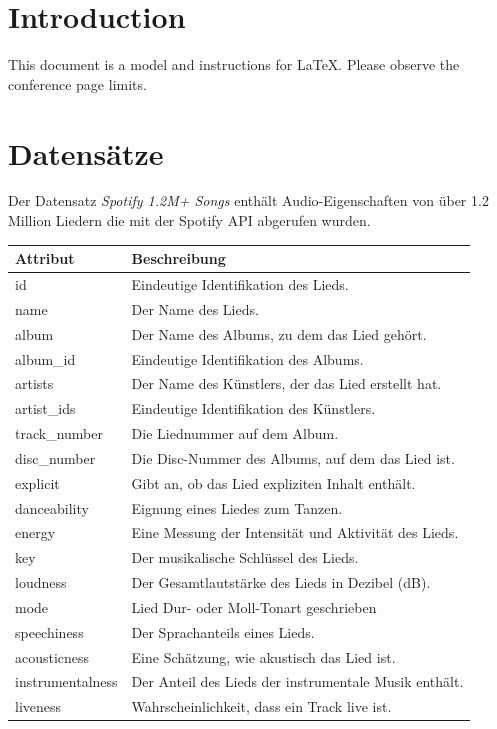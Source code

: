 \documentclass[conference]{IEEEtran}
\begin{document}
\section{Introduction}
This document is a model and instructions for \LaTeX.
Please observe the conference page limits. 
\section{Datensätze}
Der Datensatz \textit{Spotify 1.2M+ Songs} \cite{d2} enthält Audio-Eigenschaften von über 1.2 Million Liedern die mit der Spotify API abgerufen wurden.
\begin{table}[h]
\centering
\begin{tabular}{|l|l|}
\hline
Attribut & Beschreibung \\ \hline
id & Eindeutige Identifikation des Lieds. \\ \hline
name & Der Name des Lieds. \\ \hline
album & Der Name des Albums, zu dem das Lied gehört. \\ \hline
album\_id & Eindeutige Identifikation des Albums. \\ \hline
artists & Der Name des Künstlers, der das Lied erstellt hat. \\ \hline
artist\_ids & Eindeutige Identifikation des Künstlers. \\ \hline
track\_number & Die Liednummer auf dem Album. \\ \hline
disc\_number & Die Disc-Nummer des Albums, auf dem das Lied ist. \\ \hline
explicit & Gibt an, ob das Lied expliziten Inhalt enthält. \\ \hline
danceability & Eignung eines Liedes zum Tanzen. \\ \hline
energy & Eine Messung der Intensität und Aktivität des Lieds. \\ \hline
key & Der musikalische Schlüssel des Lieds. \\ \hline
loudness & Der Gesamtlautstärke des Lieds in Dezibel (dB). \\ \hline
mode & Lied Dur- oder Moll-Tonart geschrieben \\ \hline
speechiness & Der Sprachanteils eines Lieds. \\ \hline
acousticness & Eine Schätzung, wie akustisch das Lied ist. \\ \hline
instrumentalness & Der Anteil des Lieds der instrumentale Musik enthält. \\ \hline
liveness & Wahrscheinlichkeit, dass ein Track live ist. \\ \hline

\end{tabular}
\end{table}
\end{document}
